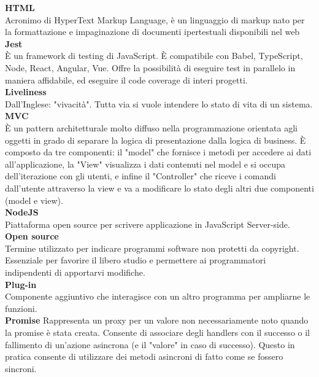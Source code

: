 \textbf{HTML}\-\\
Acronimo di HyperText Markup Language, è un linguaggio di markup nato per la formattazione e impaginazione di documenti ipertestuali disponibili nel web
\-\\

\textbf{Jest}\-\\
È un framework di testing di JavaScript. È compatibile con Babel, TypeScript, Node, React, Angular, Vue. Offre la possibilità di eseguire test in parallelo in maniera affidabile, ed eseguire il code coverage di interi progetti.
\-\\

\textbf{Liveliness}\-\\
Dall'Inglese: "vivacità". Tutta via si vuole intendere lo stato di vita di un sistema.
\-\\

\textbf{MVC}\-\\
È un pattern architetturale molto diffuso nella programmazione orientata agli oggetti in grado di separare la logica di presentazione dalla logica di business. È composto da
tre componenti: il "model" che fornisce i metodi per accedere ai dati all'applicazione, la "View" visualizza i dati contenuti nel model e si occupa dell'iterazione con gli
utenti, e infine il "Controller" che riceve i comandi dall'utente attraverso la view e va a modificare lo stato degli altri due componenti (model e view).
\-\\

\textbf{NodeJS}\-\\
Piattaforma open source per scrivere applicazione in JavaScript Server-side. 
\-\\

\textbf{Open source}\-\\
Termine utilizzato per indicare programmi software non protetti da copyright. Essenziale per favorire il libero studio e permettere ai programmatori indipendenti di apportarvi modifiche.
\-\\

\textbf{Plug-in}\-\\
Componente aggiuntivo che interagisce con un altro programma per ampliarne le funzioni.
\-\\

\textbf{Promise}
Rappresenta un proxy per un valore non necessariamente noto quando la promise è stata creata. 
Consente di associare degli handlers con il successo o il fallimento di un'azione asincrona (e il "valore" in caso di successo). Questo in pratica consente di utilizzare dei metodi asincroni di fatto 
come se fossero sincroni. 
\-\\

